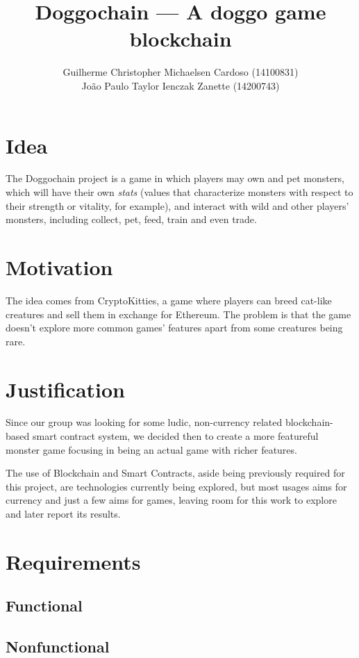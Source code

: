 \documentclass{article}
\title{Doggochain --- A doggo game blockchain}
\author{%
    Guilherme Christopher Michaelsen Cardoso (14100831) \\
    João Paulo Taylor Ienczak Zanette (14200743)
}
\begin{document}
    \maketitle

    \section{Idea}

    The Doggochain project is a game in which players may own and pet monsters,
    which will have their own \textit{stats} (values that characterize monsters
    with respect to their strength or vitality, for example), and interact with
    wild and other players' monsters, including collect, pet, feed, train and
    even trade.

    \section{Motivation}

    The idea comes from CryptoKitties, a game where players can breed cat-like
    creatures and sell them in exchange for Ethereum. The problem is that the
    game doesn't explore more common games' features apart from some creatures
    being rare.

    \section{Justification}

    Since our group was looking for some ludic, non-currency related
    blockchain-based smart contract system, we decided then to create a more
    featureful monster game focusing in being an actual game with richer
    features.

    The use of Blockchain and Smart Contracts, aside being previously required
    for this project, are technologies currently being explored, but most
    usages aims for currency and just a few aims for games, leaving room for
    this work to explore and later report its results.

    \section{Requirements}

    \subsection{Functional}

    \subsection{Nonfunctional}
\end{document}
